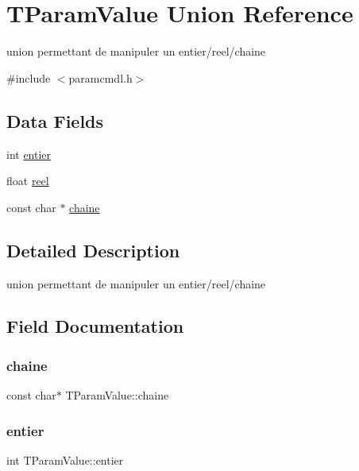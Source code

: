 \hypertarget{unionTParamValue}{}\section{T\+Param\+Value Union Reference}
\label{unionTParamValue}


union permettant de manipuler un entier/reel/chaine  




{\ttfamily \#include $<$paramcmdl.\+h$>$}

\subsection*{Data Fields}
\begin{DoxyCompactItemize}
\item 
int \hyperlink{unionTParamValue_a85a2847d254115d744ac7d55391dc1ea}{entier}
\item 
float \hyperlink{unionTParamValue_a6c6e99a421de592ad46cf47aab9cef58}{reel}
\item 
const char $\ast$ \hyperlink{unionTParamValue_a3e12f31017e3dd1bb79801330f767a22}{chaine}
\end{DoxyCompactItemize}


\subsection{Detailed Description}
union permettant de manipuler un entier/reel/chaine 

\subsection{Field Documentation}
\mbox{\label{unionTParamValue_a3e12f31017e3dd1bb79801330f767a22}} 
\subsubsection{\texorpdfstring{chaine}{chaine}}
{\footnotesize\ttfamily const char$\ast$ T\+Param\+Value\+::chaine}

\mbox{\label{unionTParamValue_a85a2847d254115d744ac7d55391dc1ea}} 
\subsubsection{\texorpdfstring{entier}{entier}}
{\footnotesize\ttfamily int T\+Param\+Value\+::entier}

